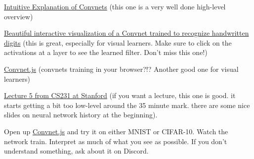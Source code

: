 \documentclass[assignment07_Solutions]{subfiles}
\begin{document}
\begin{externalresources}[(60 minutes)]
\bi
\item \href{https://ujjwalkarn.me/2016/08/11/intuitive-explanation-convnets/}{Intuitive Explanation of Convnets}  (this one is a very well done high-level overview)
\item \href{http://scs.ryerson.ca/~aharley/vis/conv/flat.html}{Beautiful interactive visualization of a Convnet trained to recognize handwritten digits} (this is great, especially for visual learners.  Make sure to click on the activations at a layer to see the learned filter.  Don't miss this one!)
\item \href{https://cs.stanford.edu/people/karpathy/convnetjs/}{Convnet.js} (convnets training in your browser?!? Another good one for visual learners)
\item \href{https://www.youtube.com/watch?v=bNb2fEVKeEo&list=PL3FW7Lu3i5JvHM8ljYj-zLfQRF3EO8sYv\&index=5}{Lecture 5 from CS231 at Stanford} (if you want a lecture, this one is good.  it starts getting a bit too low-level around the 35 minute mark.  there are some nice slides on neural network history at the beginning).
\ei
\end{externalresources}


\begin{exercise}[(15 minutes)]
Open up \href{https://cs.stanford.edu/people/karpathy/convnetjs/}{Convnet.js} and try it on either MNIST or CIFAR-10.  Watch the network train.  Interpret as much of what you see as possible.  If you don't understand something, ask about it on Discord.
\end{exercise}
\end{document}
